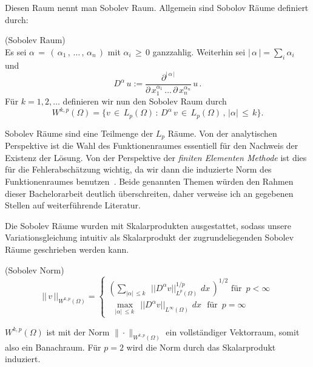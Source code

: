 Diesen Raum nennt man Sobolev Raum. Allgemein sind Sobolov Räume definiert durch:

\begin{Definition} (Sobolev Raum) \\
Es sei $\alpha \, = \, ( \, \alpha_1 \, , \, \dots  \, , \, \alpha_n \, )$ mit $\alpha_i \, \geq \, 0$ ganzzahlig. Weiterhin sei $|\, \alpha \, |= \sum_i \alpha_i$ und
\begin{equation*}
D^{\alpha} \, u := \dfrac{ \partial^{| \, \alpha \,|} } {\partial \, x_1^{\alpha_1} \, \dots \, \partial \, x_n^{\alpha_n}} \, u \, .
\end{equation*}
Für $k=1,2,\dots$ definieren wir nun den Sobolev Raum durch
\begin{equation*}
W^{k,p} (\Omega) = \{ v \, \in  \, L_p (\Omega) \, : \, D^{\alpha} \, v \, \in \, L_p (\Omega) \, , \, | \alpha | \, \leq \, k \}.
\end{equation*}
\end{Definition}

Sobolev Räume sind eine Teilmenge der $L_{p}$ Räume.
Von der analytischen Perspektive ist die Wahl des Funktionenraumes essentiell für den Nachweis der Existenz der Lösung. Von der Perspektive der \textit{finiten Elementen Methode} ist dies für die Fehlerabschätzung wichtig, da wir dann die induzierte Norm des Funktionenraumes benutzen~\cite[36]{Johnson}. Beide genannten Themen würden den Rahmen dieser Bachelorarbeit deutlich überschreiten, daher verweise ich an gegebenen Stellen auf weiterführende Literatur.

Die Sobolev Räume wurden mit Skalarprodukten ausgestattet, sodass unsere Variationsgleichung intuitiv als Skalarprodukt der zugrundeliegenden Sobolev Räume geschrieben werden kann.
\newpage
\begin{Definition} (Sobolev Norm) \\
\begin{equation*}
|| \, v \, ||_{W^{k,p}(\Omega)} =
\begin{cases}
( \sum\limits_{|\alpha| \, \leq k \, } \, \, || D^{\alpha}v ||_{L^p(\Omega)}^{1/p} \, \, dx \, )^{1/2} \text{ für } \, p < \infty \\
 \, \, \, \max\limits_{|\alpha| \, \leq k \, } \, \, || D^{\alpha}v ||_{L^{\infty}(\Omega)} \, \, dx \,  \, \text{ für } \, p = \infty 
\end{cases}
\end{equation*}
\end{Definition}

$W^{{k,p}}(\Omega )$ ist mit der Norm $ \|{\cdot }\|_{{W^{{k,p}}(\Omega )}}$ ein vollständiger Vektorraum, somit also ein Banachraum.
Für $p=2$ wird die Norm durch das Skalarprodukt induziert.

